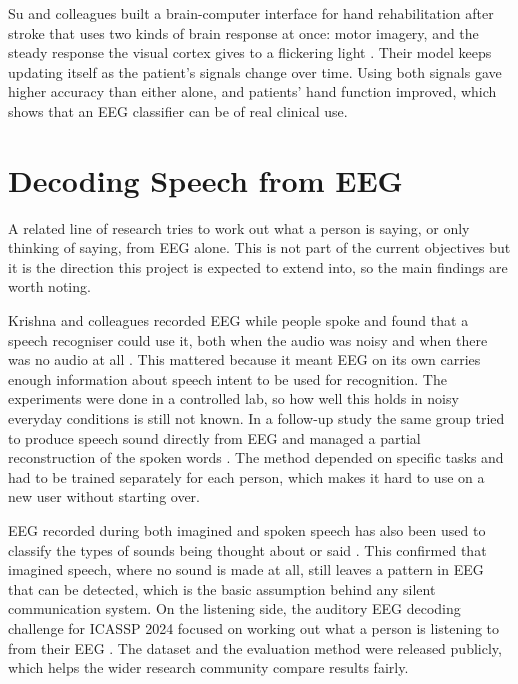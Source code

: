 Su and colleagues built a brain-computer interface for hand rehabilitation after stroke
that uses two kinds of brain response at once: motor imagery, and the steady response the
visual cortex gives to a flickering light \cite{su2024hybrid}. Their model keeps updating itself as the patient's signals change over time. Using both signals gave
higher accuracy than either alone, and patients' hand function improved, which shows that
an EEG classifier can be of real clinical use.

\section{Decoding Speech from EEG}

A related line of research tries to work out what a person is saying, or only thinking of
saying, from EEG alone. This is not part of the current objectives but it is the direction
this project is expected to extend into, so the main findings are worth noting.

Krishna and colleagues recorded EEG while people spoke and found that a speech recogniser
could use it, both when the audio was noisy and when there was no audio at all
\cite{krishna2019nospeech}. This mattered because it meant
EEG on its own carries enough information about speech intent to be used for recognition.
The experiments were done in a controlled lab, so how well this holds in noisy everyday
conditions is still not known. In a follow-up study the same group tried to produce speech sound directly from EEG and
managed a partial reconstruction of the spoken words \cite{krishna2020eeg}. The method depended on specific tasks and had to be trained
separately for each person, which makes it hard to use on a new user without starting over.

EEG recorded during both imagined and spoken speech has also been used to classify the
types of sounds being thought about or said \cite{zhao2015phonological}. This confirmed
that imagined speech, where no sound is made at all, still leaves a pattern in EEG that can
be detected, which is the basic assumption behind any silent communication system. On the
listening side, the auditory EEG decoding challenge for ICASSP 2024 focused on working out
what a person is listening to from their EEG \cite{bollens2025auditory}. The dataset and the
evaluation method were released publicly, which helps the wider research community compare
results fairly.

